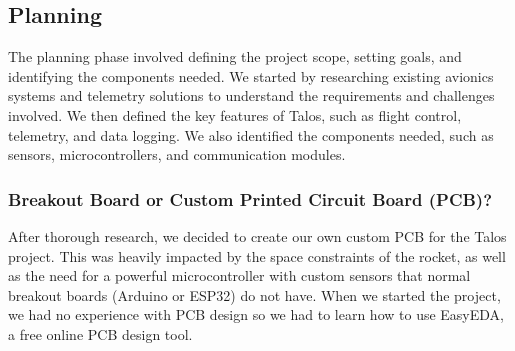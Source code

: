 \documentclass{article}
\begin{document}
\subsection{Planning}

The planning phase involved defining the project scope, setting goals, and identifying the components needed. We started by researching existing avionics systems and telemetry solutions to understand the requirements and challenges involved. We then defined the key features of Talos, such as flight control, telemetry, and data logging. We also identified the components needed, such as sensors, microcontrollers, and communication modules.
\subsubsection{Breakout Board or Custom Printed Circuit Board (PCB)?}
After thorough research, we decided to create our own custom PCB for the Talos project. This was heavily impacted by the space constraints of the rocket, as well as the need for a powerful microcontroller with custom sensors that normal breakout boards (Arduino or ESP32) do not have. When we started the project, we had no experience with PCB design so we had to learn how to use EasyEDA, a free online PCB design tool.
\end{document}
